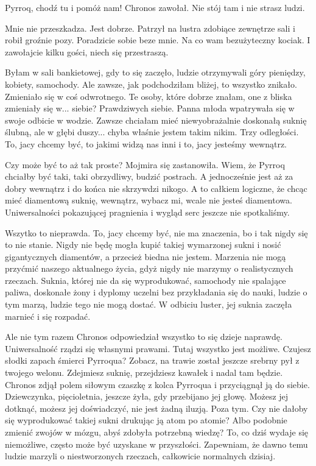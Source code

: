 \ds{} Pyrroq, chodź tu i pomóż nam! \dm{} Chronos zawołał. \dm{} Nie stój tam i nie strasz ludzi. \de{}

\ds{} Mnie nie przeszkadza. Jest dobrze. \dm{} Patrzył na lustra zdobiące zewnętrze sali i robił groźnie pozy. \dm{}
Poradzicie sobie beze mnie. Na co wam bezużyteczny kociak. I zawołajcie kilku gości, niech się przestraszą.\de{}

\ds{} Byłam w sali bankietowej, gdy to się zaczęło, ludzie otrzymywali góry pieniędzy, kobiety, samochody. Ale zawsze, jak podchodziłam bliżej, to wszystko znikało.
Zmieniało się w coś odwrotnego. Te osoby, które dobrze znałam, one z bliska zmieniały się w... siebie? Prawdziwych siebie. \dm{} Panna młoda wpatrywała się w swoje odbicie w wodzie.
\dm{} Zawsze chciałam mieć niewyobrażalnie doskonałą suknię ślubną, ale w głębi duszy... chyba właśnie jestem takim nikim. 
Trzy odległości. To, jacy chcemy być, to jakimi widzą nas inni i to, jacy jesteśmy wewnątrz. \de{}

\ds{} Czy może być to aż tak proste? \dm{} Mojmira się zastanowiła. \dm{} Wiem, że Pyrroq chciałby być taki, taki obrzydliwy, budzić postrach. 
A jednocześnie jest aż za dobry wewnątrz i do końca nie skrzywdzi nikogo. 
A to całkiem logiczne, że chcąc mieć diamentową suknię, wewnątrz, wybacz mi, wcale nie jesteś diamentowa.
Uniwersalności pokazującej pragnienia i wygląd serc jeszcze nie spotkaliśmy. \de{}

\ds{} Wszytko to nieprawda. To, jacy chcemy być, nie ma znaczenia, bo i tak nigdy się to nie stanie.
Nigdy nie będę mogła kupić takiej wymarzonej sukni i nosić gigantycznych diamentów, a przecież biedna nie jestem. 
Marzenia nie mogą przyćmić naszego aktualnego życia, gdyż nigdy nie marzymy o realistycznych rzeczach.
Suknia, której nie da się wyprodukować, samochody nie spalające paliwa, doskonałe żony i dyplomy uczelni bez przykładania się do nauki, ludzie o tym marzą, ludzie tego nie mogą dostać. \dm{} 
W odbiciu luster, jej suknia zaczęła marnieć i się rozpadać. \de{}

\ds{} Ale nie tym razem \dm{} Chronos odpowiedział \dm{} wszystko to się dzieje naprawdę. Uniwersalność rządzi się własnymi prawami. Tutaj wszystko jest możliwe.
Czujesz słodki zapach śmierci Pyrroqua? Zobacz, na trawie został jeszcze srebrny pył z twojego welonu. 
Zdejmiesz suknię, przejdziesz kawałek i nadal tam będzie. \dm{} Chronos zdjął polem siłowym czaszkę z kolca Pyrroqua i przyciągnął ją do siebie. \dm{}
Dziewczynka, pięcioletnia, jeszcze żyła, gdy przebijano jej głowę. Możesz jej dotknąć, możesz jej doświadczyć, nie jest żadną iluzją. 
Poza tym. Czy nie dałoby się wyprodukować takiej sukni drukując ją atom po atomie? Albo podobnie zmienić zwojów w mózgu, abyś zdobyła potrzebną wiedzę?
To, co dziś wydaje się niemożliwe, często może być uzyskane w przyszłości. Zapewniam, że dawno temu ludzie marzyli o niestworzonych rzeczach, całkowicie normalnych dzisiaj.\de{}

